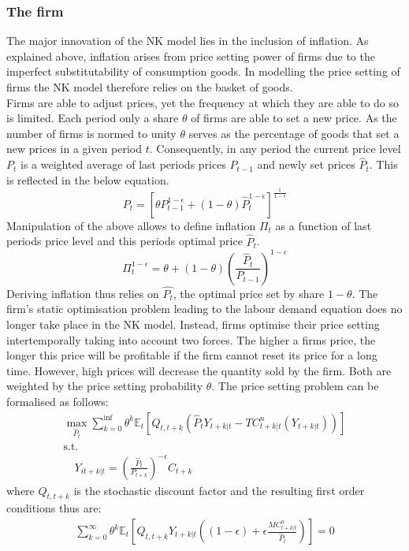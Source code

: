 \documentclass[12pt,a4paper,english]{article} %
\newcommand{\E}{\mathbb{E}} %
\begin{document}
	\subsubsection{The firm}
	The major innovation of the NK model lies in the inclusion of inflation. As explained above, inflation arises from price setting power of firms due to the imperfect substitutability of consumption goods. In modelling the price setting of firms the NK model therefore relies on the basket of goods. \\
	Firms are able to adjust prices, yet the frequency at which they are able to do so is limited. Each period only a share $\theta$ of firms are able to set a new price. As the number of firms is normed to unity $\theta$ serves as the percentage of goods that set a new prices in a given period $t$. Consequently, in any period the current price level $P_t$ is a weighted average of last periods prices $P_{t-1}$ and newly set prices $\hat{P}_t$. This is reflected in the below equation.
	\[
		P_t = \left[ 
					\theta P_{t-1}^{1 - \epsilon} + (1 - \theta) \hat{P}_t^{1 - \epsilon}
			\right]^{\frac{1}{1 - \epsilon}}
	\]
	Manipulation of the above allows to define inflation $\Pi_t$ as a function of last periods price level and this periods optimal price $\hat{P}_t$.
	\begin{equation} \label{eq: 2}
		\Pi_t^{1-\epsilon} = \theta + (1 - \theta) \left(\frac{\hat{P}_t}{P_{t-1}} \right)^{1-\epsilon}
	\end{equation}
	Deriving inflation thus relies on $\hat{P_t}$, the optimal price set by share $1-\theta$. The firm's static optimisation problem leading to the labour demand equation does no longer take place in the NK model. Instead, firms optimise their price setting intertemporally taking into account two forces. The higher a firms price, the longer this price will be profitable if the firm cannot reset its price for a long time. However, high prices will decrease the quantity sold by the firm. Both are weighted by the price setting probability $\theta$. The price setting problem can be formalised as follows: 
	\begin{equation}
		\begin{aligned}
			\max_{\hat{P}_t}
			\sum_{k=0}^{\inf} \theta^k \E_t 
			\left[
			Q_{t, t+k} 
			\left(
			\hat{P}_t Y_{t+k|t} - TC_{t+k|t}^n(Y_{t+k|t})
			\right)
			\right] \\
			\textrm{s.t.}\\
			\quad
			Y_{it+k|t} = \left(\frac{\hat{P}_t}{P_{t+k}} \right)^{-\epsilon} C_{t+k}
		\end{aligned}
	\end{equation}
	where $Q_{t, t+k}$ is the stochastic discount factor and the resulting first order conditions thus are:
	\begin{equation}
		\begin{aligned}
			\sum_{k=0}^{\infty} \theta^k \E_t 
			\left[
			Q_{t,t+k} Y_{t+k|t} 
			\left(
			(1 - \epsilon) + \epsilon \frac{MC_{t+k|t}^n}{\hat{P}_t}
			\right)
			\right]
			= 0
		\end{aligned}
	\end{equation}
	
\end{document}
